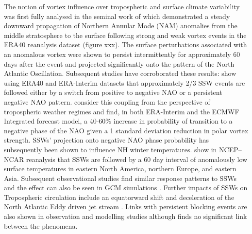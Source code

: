 The notion of vortex influence over tropospheric and surface climate variability was first fully analysed in the seminal work of \cite{baldwinStratospheric2001} which demonstrated a steady downward propagation of Northern Annular Mode (NAM) anomalies from the middle stratosphere to the surface following strong and weak vortex events in the ERA40 reanalysis dataset (figure xxx). The surface perturbations associated with an anomalous vortex were shown to persist intermittently for approximately 60 days after the event and projected significantly onto the pattern of the North Atlantic Oscillation. Subsequent studies have corroborated these results: \cite{domeisenEstimating2019} show using ERA40 and ERA-Interim datasets that approximately 2/3 SSW events are followed either by a switch from positive to negative NAO or a persistent negative NAO pattern. \cite{charlton-perezInfluence2018} consider this coupling from the perspective of tropospheric weather regimes and find, in both ERA-Interim and the ECMWF Integrated forecast model, a 40-60\% increase in probability of transition to a negative phase of the NAO given a 1 standard deviation reduction in polar vortex strength. SSWs' projection onto negative NAO phase probability has subsequently been shown to influence NH winter temperatures. \cite{thompsonStratospheric2002} show in NCEP–NCAR reanalysis that SSWs are followed by a 60 day interval of anomalously low surface temperatures in eastern North America, northern Europe, and eastern Asia. Subsequent observational studies find similar response patterns to SSWs \citep{kolstadAssociation2010, kingObserved2019, lehtonenObserved2016} and the effect can also be seen in GCM simulations \citep{tomassiniRole2012, lehtonenObserved2016}. Further impacts of SSWs on Tropospheric circulation include an equatorward shift and deceleration of the North Atlantic Eddy driven jet stream \citep{hitchcockDownward2014,maycockRegime2020}. Links with persistent blocking events are also shown in observation and modelling studies \citep{daviniBlocking2014, vialSudden2013} although \cite{taguchiThere2008} finds no significant link between the phenomena.


